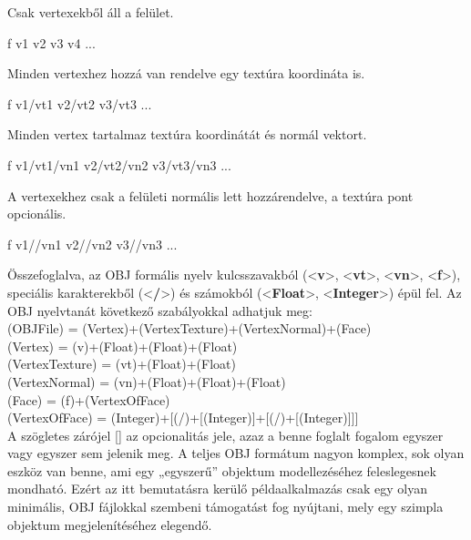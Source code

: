 \noindent Csak vertexekből áll a felület.
\begin{center} f v1 v2 v3 v4 ...\end{center}
Minden vertexhez hozzá van rendelve egy textúra koordináta is.
\begin{center} f v1/vt1 v2/vt2 v3/vt3 ...\end{center}
Minden vertex tartalmaz textúra koordinátát és normál vektort.
\begin{center} f v1/vt1/vn1 v2/vt2/vn2 v3/vt3/vn3 ...\end{center}
A vertexekhez csak a felületi normális lett hozzárendelve, a textúra pont opcionális.
\begin{center} f v1//vn1 v2//vn2 v3//vn3 ...\end{center}
Összefoglalva, az OBJ formális nyelv kulcsszavakból (<\textbf{v}>, <\textbf{vt}>, <\textbf{vn}>, <\textbf{f}>), speciális karakterekből (<\textbf{/}>) és számokból (<\textbf{Float}>, <\textbf{Integer}>) épül fel. Az OBJ nyelvtanát következő szabályokkal adhatjuk meg:\\

\noindent(OBJFile) = {(Vertex)}+{(VertexTexture)}+{(VertexNormal)}+{(Face)}\\
(Vertex) = (v)+(Float)+(Float)+(Float)\\
(VertexTexture) = (vt)+(Float)+(Float)\\
(VertexNormal) = (vn)+(Float)+(Float)+(Float)\\
(Face) = (f)+{(VertexOfFace)}\\
(VertexOfFace) = (Integer)+[(/)+[(Integer)]+[(/)+[(Integer)]]]\\

A szögletes zárójel [] az opcionalitás jele, azaz a benne foglalt fogalom egyszer vagy egyszer sem jelenik meg. A teljes OBJ formátum nagyon komplex, sok olyan eszköz van benne, ami egy „egyszerű” objektum modellezéséhez feleslegesnek mondható. Ezért az itt bemutatásra kerülő példaalkalmazás csak egy olyan minimális, OBJ fájlokkal szembeni támogatást fog nyújtani, mely egy szimpla objektum megjelenítéséhez elegendő.
